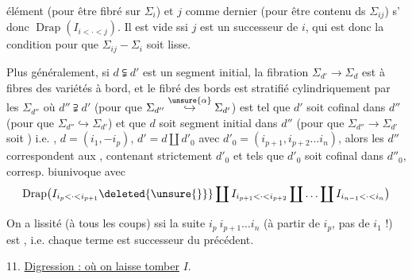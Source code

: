 élément (pour être fibré sur $\Sigma_i$) et $j$ comme dernier (pour être contenu ds $\Sigma_{ij}$) s' donc \inserted{$\simeq$} $\operatorname{Drap}(I_{i<\cdot<j})$. Il est vide ssi $j$ est un successeur de $i$, qui est donc la condition pour que $\Sigma_{ij}-\Sigma_i$ soit lisse.

Plus généralement, si $d\subsetneqq d'$ est un segment initial, la fibration $\Sigma_{d'}\longrightarrow\Sigma_d$ est à fibres des variétés à bord, et le fibré des bords est stratifié cylindriquement par les $\Sigma_{d''}$ où $d''\supsetneqq d'$ (pour que $\Sigma_{d''}\overset{\unsure{\alpha}}{\hookrightarrow}\Sigma_{d'}$) est tel que $d'$ soit cofinal dans $d''$ (pour que $\Sigma_{d''}\hookrightarrow\Sigma_{d'}$) et que $d$ soit segment initial dans $d''$ (pour que $\Sigma_{d''}\longrightarrow\Sigma_{d'}$ soit ) i.e.  , $d=(i_1,-i_p)$,  $d'=d\coprod d'_0$  avec $d'_0=(i_{p+1},i_{p+2}\ldots i_n)$, alors les $d''$ correspondent aux
, contenant  strictement $d'_0$ et tels que $d'_0$ soit cofinal dans $d''_0$,   corresp. biunivoque avec
\[
\operatorname{Drap}\bigl(I_{i_p<\cdot<i_{p+1}}\deleted{\unsure{\}}}\coprod I_{i_{p+1}<\cdot<i_{p+2}}\coprod\ldots\coprod I_{i_{n-1}<\cdot<i_n}\bigr)
\]

On a lissité (à tous les coups) ssi  la suite $i_p\ i_{p+1}\ldots i_n$ (à partir de $i_p$, pas de $i_1$ !) est , i.e. chaque terme  est successeur  du précédent.

11. \uline{Digression : où on laisse tomber} $I$.

